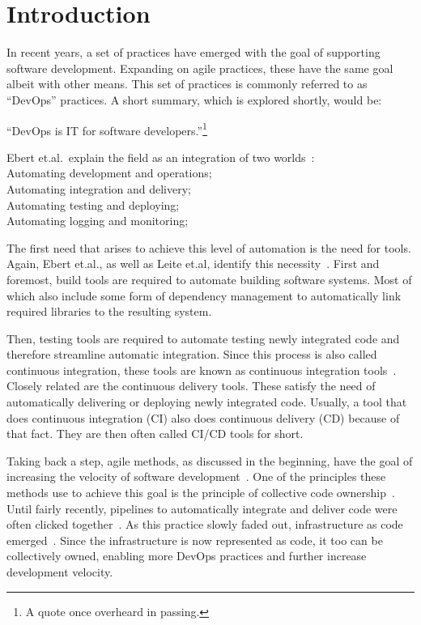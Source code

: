 \chapter{Introduction}
\label{ch:introduction}

In recent years, a set of practices have emerged with the goal of supporting software development.
Expanding on agile practices, these have the same goal albeit with other means.
This set of practices is commonly referred to as ``DevOps'' practices.
A short summary, which is explored shortly, would be:

``DevOps is IT for software developers.''\footnote{A quote once overheard in passing.}

Ebert et.al.\ explain the field as an integration of two worlds~\cite{DevOps}: \\
Automating development and operations; \\
Automating integration and delivery; \\
Automating testing and deploying; \\
Automating logging and monitoring;

The first need that arises to achieve this level of automation is the need for tools.
Again, Ebert et.al., as well as Leite et.al, identify this necessity~\cite{DevOps, ASurveyofDevOpsConceptsandChallenges}.
First and foremost, build tools are required to automate building software systems.
Most of which also include some form of dependency management to automatically link required libraries to the resulting system.

Then, testing tools are required to automate testing newly integrated code and therefore streamline automatic integration.
Since this process is also called continuous integration, these tools are known as continuous integration tools~\cite{DevOps}.
Closely related are the continuous delivery tools.
These satisfy the need of automatically delivering or deploying newly integrated code.
Usually, a tool that does continuous integration (CI) also does continuous delivery (CD) because of that fact.
They are then often called CI/CD tools for short.

Taking back a step, agile methods, as discussed in the beginning, have the goal of increasing the velocity of software development~\cite{ADecadeOfAgileMethodologies}.
One of the principles these methods use to achieve this goal is the principle of collective code ownership~\cite{CommonAgilePracticesInSoftwareProcesses, ManagingCodeOwnership}.
Until fairly recently, pipelines to automatically integrate and deliver code were often clicked together~\cite{JenkinsClassicUi}.
As this practice slowly faded out, infrastructure as code emerged~\cite{ASystematicMappingStudyOfInfrastructureAsCodeResearch}.
Since the infrastructure is now represented as code, it too can be collectively owned, enabling more DevOps practices and further increase development velocity.

